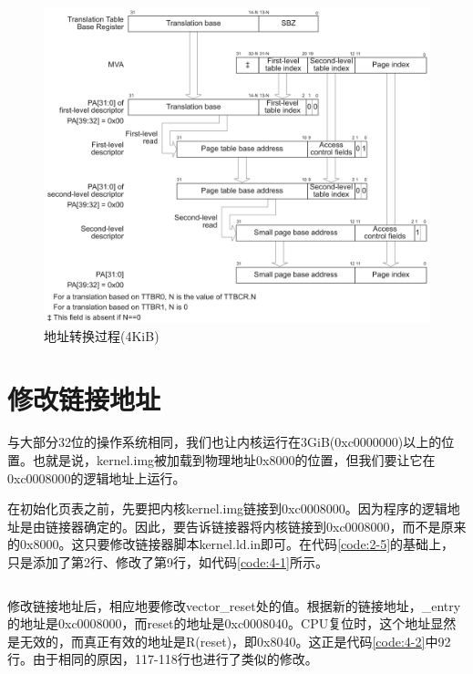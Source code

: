 \documentclass[main.tex]{subfiles}
\begin{document}
\begin{CJK*}{UTF8}{song}
\begin{figure}[htp]
\centering
\includegraphics[scale=0.3]{figures/4-4}
\caption{地址转换过程(4KiB)}
\label{figure:4-4}
\end{figure}

\section{修改链接地址}
与大部分32位的操作系统相同，我们也让内核运行在3GiB(0xc0000000)以上的位置。也就是说，kernel.img被加载到物理地址0x8000的位置，但我们要让它在0xc0008000的逻辑地址上运行。

\par
在初始化页表之前，先要把内核kernel.img链接到0xc0008000。因为程序的逻辑地址是由链接器确定的。因此，要告诉链接器将内核链接到0xc0008000，而不是原来的0x8000。这只要修改链接器脚本kernel.ld.in即可。在代码\ref{code:2-5}的基础上，只是添加了第2行、修改了第9行，如代码\ref{code:4-1}所示。

\begin{code}
\label{code:4-1}
\inputminted[firstline=1,lastline=12,linenos,numbersep=5pt,frame=lines,framesep=2mm]{c}{src/chapter04/kernel/kernel.ld.in}
\end{code}

修改链接地址后，相应地要修改vector\_reset处的值。根据新的链接地址，\_entry的地址是0xc0008000，而reset的地址是0xc0008040。CPU复位时，这个地址显然是无效的，而真正有效的地址是R(reset)，即0x8040。这正是代码\ref{code:4-2}中92行。由于相同的原因，117-118行也进行了类似的修改。


\end{CJK*}
\end{document}
